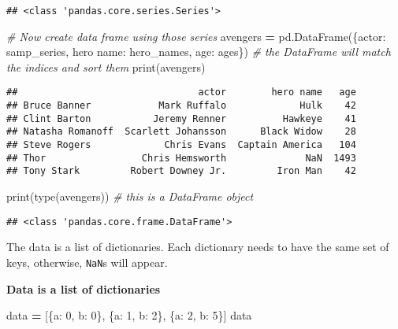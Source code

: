 \documentclass[
]{book}
\newenvironment{Shaded}{\begin{snugshade}}{\end{snugshade}}
\newcommand{\BuiltInTok}[1]{#1}
\newcommand{\CommentTok}[1]{\textcolor[rgb]{0.56,0.35,0.01}{\textit{#1}}}
\newcommand{\DecValTok}[1]{\textcolor[rgb]{0.00,0.00,0.81}{#1}}
\newcommand{\NormalTok}[1]{#1}
\newcommand{\OperatorTok}[1]{\textcolor[rgb]{0.81,0.36,0.00}{\textbf{#1}}}
\newcommand{\StringTok}[1]{\textcolor[rgb]{0.31,0.60,0.02}{#1}}
\begin{document}
\begin{verbatim}
## <class 'pandas.core.series.Series'>
\end{verbatim}

\begin{Shaded}
\begin{Highlighting}[]
\CommentTok{\# Now create data frame using those series}
\NormalTok{avengers }\OperatorTok{=}\NormalTok{ pd.DataFrame(\{}\StringTok{\textquotesingle{}actor\textquotesingle{}}\NormalTok{: samp\_series, }\StringTok{\textquotesingle{}hero name\textquotesingle{}}\NormalTok{: hero\_names, }\StringTok{\textquotesingle{}age\textquotesingle{}}\NormalTok{: ages\})}
\CommentTok{\# the DataFrame will match the indices and sort them}
\BuiltInTok{print}\NormalTok{(avengers)}
\end{Highlighting}
\end{Shaded}

\begin{verbatim}
##                                actor        hero name   age
## Bruce Banner            Mark Ruffalo             Hulk    42
## Clint Barton           Jeremy Renner          Hawkeye    41
## Natasha Romanoff  Scarlett Johansson      Black Widow    28
## Steve Rogers             Chris Evans  Captain America   104
## Thor                 Chris Hemsworth              NaN  1493
## Tony Stark         Robert Downey Jr.         Iron Man    42
\end{verbatim}

\begin{Shaded}
\begin{Highlighting}[]
\BuiltInTok{print}\NormalTok{(}\BuiltInTok{type}\NormalTok{(avengers)) }\CommentTok{\# this is a DataFrame object}
\end{Highlighting}
\end{Shaded}

\begin{verbatim}
## <class 'pandas.core.frame.DataFrame'>
\end{verbatim}

The data is a list of dictionaries. Each dictionary needs to have the same set of keys,
otherwise, \texttt{NaN}s will appear.

\textbf{Data is a list of dictionaries}

\begin{Shaded}
\begin{Highlighting}[]
\NormalTok{data }\OperatorTok{=}\NormalTok{ [\{}\StringTok{\textquotesingle{}a\textquotesingle{}}\NormalTok{: }\DecValTok{0}\NormalTok{, }\StringTok{\textquotesingle{}b\textquotesingle{}}\NormalTok{: }\DecValTok{0}\NormalTok{\},}
\NormalTok{        \{}\StringTok{\textquotesingle{}a\textquotesingle{}}\NormalTok{: }\DecValTok{1}\NormalTok{, }\StringTok{\textquotesingle{}b\textquotesingle{}}\NormalTok{: }\DecValTok{2}\NormalTok{\},}
\NormalTok{        \{}\StringTok{\textquotesingle{}a\textquotesingle{}}\NormalTok{: }\DecValTok{2}\NormalTok{, }\StringTok{\textquotesingle{}b\textquotesingle{}}\NormalTok{: }\DecValTok{5}\NormalTok{\}]}
\NormalTok{data}
\end{Highlighting}
\end{Shaded}
\end{document}
